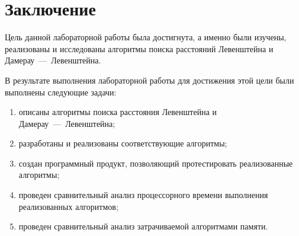 \chapter*{Заключение}

Цель данной лабораторной работы была достигнута, а именно были изучены, реализованы и исследованы алгоритмы поиска расстояний Левенштейна и Дамерау~---~Левенштейна.

В результате выполнения лабораторной работы для достижения этой цели были выполнены следующие задачи:
\begin{enumerate}
    \item описаны алгоритмы поиска расстояния Левенштейна и Дамерау~---~Левенштейна;
    \item разработаны и реализованы соответствующие алгоритмы;
    \item создан программный продукт, позволяющий протестировать реализованные алгоритмы;
    \item проведен сравнительный анализ процессорного времени выполнения реализованных алгоритмов;
    \item проведен сравнительный анализ затрачиваемой алгоритмами памяти.
\end{enumerate}
